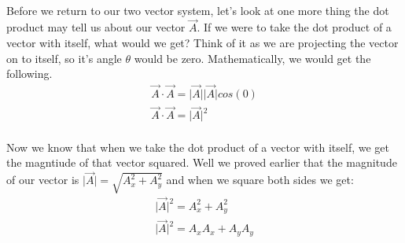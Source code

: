 \documentclass[12pt, letterpaper]{report}
\begin{document}
		\paragraph{} Before we return to our two vector system, let's look at one more thing the dot product may tell us about our vector $\vec{A}$. If we were to take the dot product of a vector with itself, what would we get? Think of it as we are projecting the vector on to itself, so it's angle $\theta$ would be zero. Mathematically, we would get the following.
		\begin{align*}
		\vec{A}\cdot\vec{A} = \lvert\vec{A}\rvert\lvert\vec{A}\rvert cos\left(0\right)\\
		\vec{A}\cdot\vec{A} = \lvert\vec{A}\rvert^2
		\end{align*}
		\paragraph{} Now we know that when we take the dot product of a vector with itself, we get the magntiude of that vector squared. Well we proved earlier that the magnitude of our vector is $\lvert\vec{A}\rvert = \sqrt{A_x^2 + A_y^2}$ and when we square both sides we get:
		\begin{align*}
		\lvert\vec{A}\rvert^2 = A_x^2 + A_y^2\\
		\lvert\vec{A}\rvert^2 = A_xA_x + A_yA_y
		\end{align*}
\end{document}
